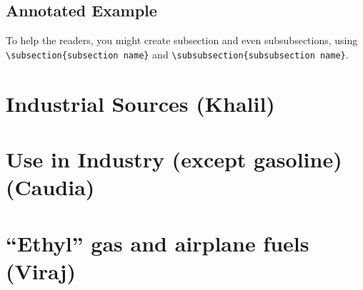 \documentclass{article}\usepackage[]{graphicx}\usepackage[]{color}
\begin{document}
\subsection{Annotated Example}

\bigskip

\bigskip


To help the readers, you might create subsection and even subsubsections, using \verb!\subsection{subsection name}! and \verb!\subsubsection{subsubsection name}!. 


\section{Industrial Sources (Khalil)}


\section{Use in Industry (except gasoline) (Caudia)}

\section{``Ethyl'' gas and airplane fuels (Viraj)}

\end{document}
